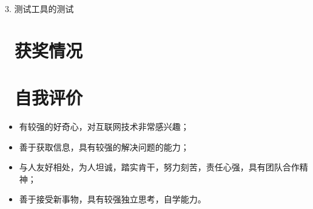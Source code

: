 \documentclass{resume}
\begin{document}
3. 测试工具的测试





\section{\faHeartO\ 获奖情况}
\begin{itemize}[parsep=0.5ex]

\end{itemize}

\section{\faInfo\ 自我评价}
\begin{itemize}[parsep=0.5ex]
  \item 有较强的好奇心，对互联网技术非常感兴趣；
  \item 善于获取信息，具有较强的解决问题的能力；
  \item 与人友好相处，为人坦诚，踏实肯干，努力刻苦，责任心强，具有团队合作精神；
  \item 善于接受新事物，具有较强独立思考，自学能力。
\end{itemize}

%
%
\end{document}
